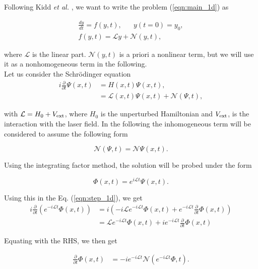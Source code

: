 \documentclass[10pt]{article}
\begin{document}
Following Kidd \textit{et al.} \cite{kidd2017}, we want to write 
the problem (\ref{eqn:main_1d}) as 

\begin{align}
\frac{dy}{dt} = f(y,t), \hspace{20pt} y(t=0) = y_0, \\
f(y,t) = \mathcal{L}y + \mathcal{N}(y,t),
\end{align}

\noindent where $\mathcal{L}$ is the linear part. 
$\mathcal{N}(y,t)$ is a priori a nonlinear term, 
but we will use it as a nonhomogeneous term in the following. \\

Let us consider the Schr\"odinger equation
\begin{align}
i\frac{\partial}{\partial t} \Psi(x,t) & = H(x,t) \Psi(x,t), \\
           & = \mathcal{L}(x,t)\Psi(x,t) + \mathcal{N}(\Psi,t),
\end{align}

\noindent with $\mathcal{L} = H_0 + V_{\rm ext}$, 
where $H_0$ is the unperturbed Hamiltonian and $V_{\rm ext}$,
is the interaction with the laser field. 
In the following the inhomogeneous term 
will be considered to assume the following form

\begin{equation}
\mathcal{N}(\Psi,t) = \mathcal{N}\Psi(x,t).
\end{equation}

Using the integrating factor method, the solution will be probed
under the form

\begin{equation}
 \Phi(x,t) = e^{i\mathcal{L}t}\Psi(x,t). \label{eqn:if}
\end{equation}

Using this in the Eq. (\ref{eqn:step_1d}), we get
\begin{align}
  i\frac{\partial}{\partial t}\left( e^{-i\mathcal{L}t}\Phi(x,t) \right)
         & = i\left( -i\mathcal{L}e^{-i\mathcal{L}t}\Phi(x,t)
          + e^{-i\mathcal{L}t}
          \frac{\partial}{\partial t}\Phi(x,t)  \right) \\
         & =  \mathcal{L}e^{-i\mathcal{L}t}\Phi(x,t)
          + ie^{-i\mathcal{L}t}
          \frac{\partial}{\partial t}\Phi(x,t)
\end{align}

Equating with the RHS, we then get

\begin{align}
     \frac{\partial}{\partial t}\Phi(x,t)
         & = - ie^{-i\mathcal{L}t}
          \mathcal{N}\left( e^{-i\mathcal{L}t} \Phi, t\right).
\end{align}
\end{document}
